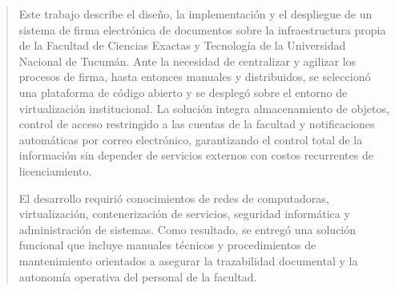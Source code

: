 \documentclass[
	11pt, %
	openany, %
	spanish,
	singlespacing, %
	parskip, %
	headsepline, %
	fleqn, %
	leqno, %
]{MastersDoctoralThesis} %
\begin{document}

\begin{abstract}
\addchaptertocentry{\abstractname} %
%
\centering

Este trabajo describe el diseño, la implementación y el despliegue de un sistema de firma electrónica de documentos sobre la infraestructura propia de la Facultad de Ciencias Exactas y Tecnología de la Universidad Nacional de Tucumán. Ante la necesidad de centralizar y agilizar los procesos de firma, hasta entonces manuales y distribuidos, se seleccionó una plataforma de código abierto y se desplegó sobre el entorno de virtualización institucional. La solución integra almacenamiento de objetos, control de acceso restringido a las cuentas de la facultad y notificaciones automáticas por correo electrónico, garantizando el control total de la información sin depender de servicios externos con costos recurrentes de licenciamiento.

El desarrollo requirió conocimientos de redes de computadoras, virtualización, contenerización de servicios, seguridad informática y administración de sistemas. Como resultado, se entregó una solución funcional que incluye manuales técnicos y procedimientos de mantenimiento orientados a asegurar la trazabilidad documental y la autonomía operativa del personal de la facultad.

\end{abstract}

\end{document}
